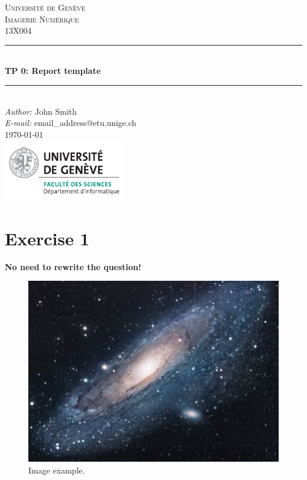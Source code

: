 \documentclass[a4paper]{article}
\makeatletter
\newcommand\TPid{0}
\newcommand\TPname{Report template}
\newcommand\Firstname{John}
\newcommand\Familyname{Smith}
\newcommand\Email{email\_address@etu.unige.ch}
\makeatother
\begin{document}
\begin{titlepage}

\newcommand{\HRule}{\rule{\linewidth}{0.5mm}} 							%
\center 
 
\textsc{\LARGE Université de Genève}\\[1cm]

\textsc{\Large Imagerie Numérique}\\[0.2cm]
\textsc{\large 13X004}\\[1cm] 										%
\HRule \\[0.8cm]
{ \huge \bfseries TP \TPid : \TPname}\\[0.7cm]								%
\HRule \\[2cm]
\large
\emph{Author:} \Firstname \; \Familyname\\[0.5cm]		
\emph{E-mail:} {\color{blue}\Email}\\[7cm]		
{\large \today}\\[2cm]
\includegraphics[width=0.4\textwidth]{images/unige_csd.png}\\[1cm] 	%
\vfill 
\end{titlepage}



\section*{Exercise 1}

\textbf{\color{red}No need to rewrite the question!}\\

\lipsum[1]

\begin{figure}[h!]
    \centering
    \includegraphics[scale=1.5]{images/universe.jpg}
    \caption{Image example.}
    \label{fig:my_label}
\end{figure}
\end{document}
